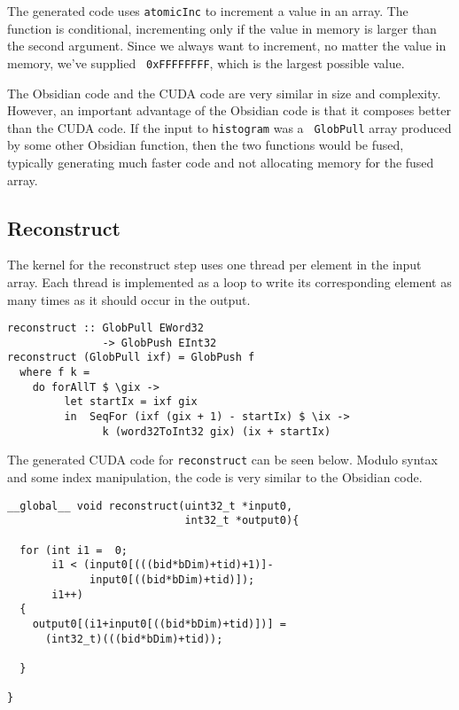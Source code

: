 The generated code uses \verb!atomicInc! to increment a value in an
array. The function is conditional, incrementing only if the value in
memory is larger than the second argument. Since we always want to
increment, no matter the value in memory, we've supplied {\tt
  0xFFFFFFFF}, which is the largest possible value.

The Obsidian code and the CUDA code are very similar in size and complexity. 
However, an important advantage of the Obsidian code is that it composes better
than the CUDA code. If the input to {\tt histogram} was a {\tt
  GlobPull} array produced by some other Obsidian function, then the
two functions would be fused, typically generating much faster code
and not allocating memory for the fused array.

\subsection{Reconstruct}

The kernel for the reconstruct step uses one thread per element in the
input array. Each thread is implemented as a loop to write its
corresponding element as many times as it should occur in the output.

\begin{small}
\begin{Verbatim}[samepage=true] 
reconstruct :: GlobPull EWord32 
               -> GlobPush EInt32
reconstruct (GlobPull ixf) = GlobPush f
  where f k = 
    do forAllT $ \gix ->
         let startIx = ixf gix 
         in  SeqFor (ixf (gix + 1) - startIx) $ \ix ->
               k (word32ToInt32 gix) (ix + startIx)
\end{Verbatim}
\end{small}

The generated CUDA code for \verb!reconstruct! can be seen
below. Modulo syntax and some index manipulation, the code is very
similar to the Obsidian code.

\begin{small}
\begin{Verbatim}[samepage=true]
__global__ void reconstruct(uint32_t *input0,
                            int32_t *output0){
  
  for (int i1 =  0;
       i1 < (input0[(((bid*bDim)+tid)+1)]-
             input0[((bid*bDim)+tid)]);
       i1++)
  {
    output0[(i1+input0[((bid*bDim)+tid)])] = 
      (int32_t)(((bid*bDim)+tid));
    
  }
  
}
\end{Verbatim}
\end{small}

